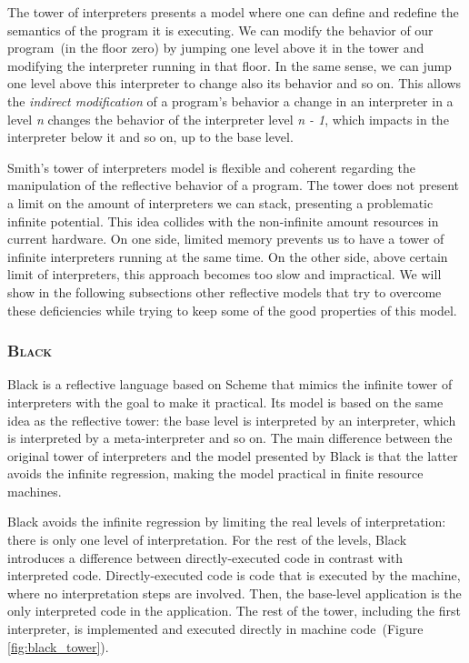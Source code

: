 The tower of interpreters presents a model where one can define and redefine the semantics of the program it is executing. We can modify the behavior of our program~(in the floor zero) by jumping one level above it in the tower and modifying the interpreter running in that floor. In the same sense, we can jump one level above this interpreter to change also its behavior and so on. This allows the \emph{indirect modification} of a program's behavior \ie a change in an interpreter in a level \emph{n} changes the behavior of the interpreter level \emph{n - 1}, which impacts in the interpreter below it and so on, up to the base level.

Smith's tower of interpreters model is flexible and coherent regarding the manipulation of the reflective behavior of a program. The tower does not present a limit on the amount of interpreters we can stack, presenting a problematic infinite potential. This idea collides with the non-infinite amount resources in current hardware. On one side, limited memory prevents us to have a tower of infinite interpreters running at the same time. On the other side, above certain limit of interpreters, this approach becomes too slow and impractical. We will show in the following subsections other reflective models that try to overcome these deficiencies while trying to keep some of the good properties of this model.

\subsubsection*{\textsc{Black}}

Black is a reflective language based on Scheme that mimics the infinite tower of interpreters with the goal to make it practical. Its model is based on the same idea as the reflective tower: the base level is interpreted by an interpreter, which is interpreted by a meta-interpreter and so on. The main difference between the original tower of interpreters and the model presented by Black is that the latter avoids the infinite regression, making the model practical in finite resource machines.

Black avoids the infinite regression by limiting the real levels of interpretation: there is only one level of interpretation. For the rest of the levels, Black  introduces a difference between directly-executed code in contrast with interpreted code. Directly-executed code is code that is executed by the machine, where no interpretation steps are involved. Then, the base-level application is the only interpreted code in the application. The rest of the tower, including the first interpreter, is implemented and executed directly in machine code~(Figure \ref{fig:black_tower}).

